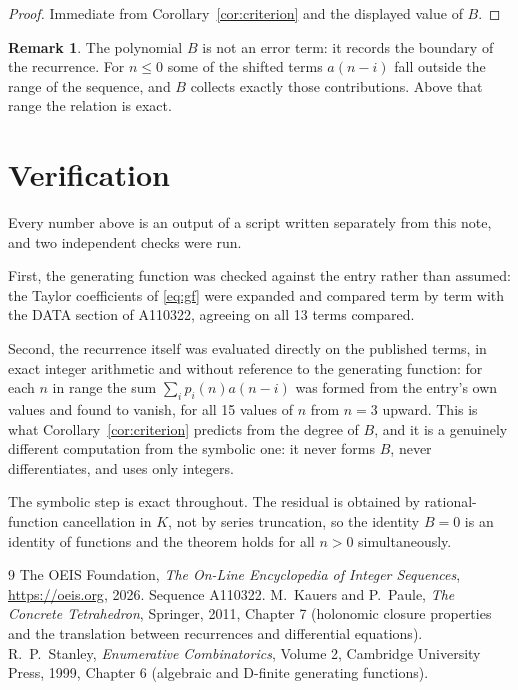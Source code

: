 \documentclass[11pt,a4paper]{article}
\theoremstyle{plain}
\theoremstyle{definition}
\newtheorem{remark}[theorem]{Remark}
\begin{document}
\begin{proof}
Immediate from Corollary~\ref{cor:criterion} and the displayed value of $B$.
\end{proof}

\begin{remark}
The polynomial $B$ is not an error term: it records the boundary of the recurrence. For
$n\le0$ some of the shifted terms $a(n-i)$ fall outside the range of the sequence,
and $B$ collects exactly those contributions. Above that range the relation is exact.
\end{remark}

\section{Verification}

Every number above is an output of a script written separately from this note, and two
independent checks were run.

First, the generating function was checked against the entry rather than assumed: the
Taylor coefficients of \eqref{eq:gf} were expanded and compared term by term with the DATA
section of A110322, agreeing on all 13 terms compared.

Second, the recurrence itself was evaluated directly on the published terms, in exact
integer arithmetic and without reference to the generating function: for each $n$ in range
the sum $\sum_{i}p_{i}(n)a(n-i)$ was formed from the entry's own values and found to
vanish, for all 15 values of $n$ from $n=3$ upward. This is what
Corollary~\ref{cor:criterion} predicts from the degree of $B$, and it is a genuinely
different computation from the symbolic one: it never forms $B$, never differentiates, and
uses only integers.

The symbolic step is exact throughout. The residual is obtained by rational-function
cancellation in $K$, not by series truncation, so the identity $B=0$ is an
identity of functions and the theorem holds for all $n>0$ simultaneously.

\begin{thebibliography}{9}
 The OEIS Foundation, \emph{The On-Line Encyclopedia of Integer Sequences},
\url{https://oeis.org}, 2026. Sequence A110322.
 M.~Kauers and P.~Paule, \emph{The Concrete Tetrahedron}, Springer, 2011,
Chapter 7 (holonomic closure properties and the translation between recurrences and
differential equations).
 R.~P.~Stanley, \emph{Enumerative Combinatorics}, Volume 2, Cambridge
University Press, 1999, Chapter 6 (algebraic and D-finite generating functions).
\end{thebibliography}
\end{document}
